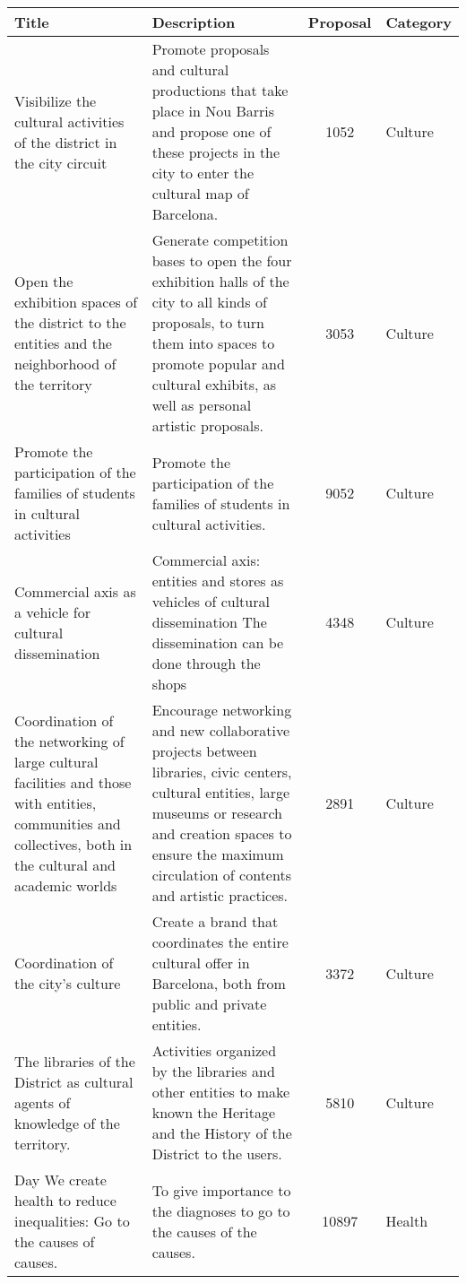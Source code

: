 \scriptsize %
\begin{spacing}{1}
\begin{longtable}{m{30mm}|m{85mm}|c|m{15mm}}
\hline
Title & Description & Proposal & Category  \\
\hline
\hline
\endhead
 Visibilize the cultural activities of the district in the city circuit & Promote proposals and cultural productions that take place in Nou Barris and propose one of these projects in the city to enter the cultural map of Barcelona. & 1052 & Culture  \\ \hline
 Open the exhibition spaces of the district to the entities and the neighborhood of the territory & Generate competition bases to open the four exhibition halls of the city to all kinds of proposals, to turn them into spaces to promote popular and cultural exhibits, as well as personal artistic proposals. & 3053 & Culture  \\ \hline
 Promote the participation of the families of students in cultural activities & Promote the participation of the families of students in cultural activities. & 9052 & Culture  \\ \hline
 Commercial axis as a vehicle for cultural dissemination & Commercial axis: entities and stores as vehicles of cultural dissemination The dissemination can be done through the shops & 4348 & Culture \\ \hline
 Coordination of the networking of large cultural facilities and those with entities, communities and collectives, both in the cultural and academic worlds & Encourage networking and new collaborative projects between libraries, civic centers, cultural entities, large museums or research and creation spaces to ensure the maximum circulation of contents and artistic practices. & 2891 & Culture \\ \hline
 Coordination of the city's culture & Create a brand that coordinates the entire cultural offer in Barcelona, ​​both from public and private entities. & 3372 & Culture \\ \hline
 The libraries of the District as cultural agents of knowledge of the territory. & Activities organized by the libraries and other entities to make known the Heritage and the History of the District to the users. & 5810 & Culture \\ \hline
 Day We create health to reduce inequalities: Go to the causes of causes. & To give importance to the diagnoses to go to the causes of the causes. & 10897 & Health \\ \hline

\end{longtable}
\end{spacing}
